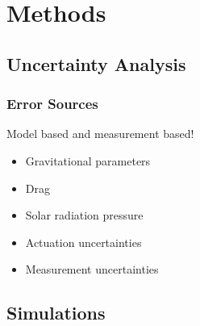 \section{Methods}


\subsection{Uncertainty Analysis}


\subsubsection{Error Sources}

Model based and measurement based! \\


\begin{itemize}
    \item Gravitational parameters \\
    \item Drag \\
    \item Solar radiation pressure \\
    \item Actuation uncertainties \\
    \item Measurement uncertainties \\
\end{itemize}
    




\subsection{Simulations}



